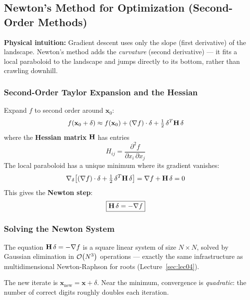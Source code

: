\subsection{Newton's Method for Optimization (Second-Order Methods)}

\noindent\textbf{Physical intuition:} Gradient descent uses only the slope
(first derivative) of the landscape. Newton's method adds the \emph{curvature}
(second derivative) — it fits a local paraboloid to the landscape and jumps
directly to its bottom, rather than crawling downhill.

\subsubsection{Second-Order Taylor Expansion and the Hessian}
Expand $f$ to second order around $\mathbf{x}_0$:
\begin{equation}
f(\mathbf{x}_0 + \delta)
\approx f(\mathbf{x}_0) + (\nabla f)\cdot\delta
+ \tfrac{1}{2}\,\delta^T \mathbf{H}\,\delta
\end{equation}
where the \textbf{Hessian matrix} $\mathbf{H}$ has entries
\begin{equation}
H_{ij} = \frac{\partial^2 f}{\partial x_i\,\partial x_j}
\end{equation}
The local paraboloid has a unique minimum where its gradient vanishes:
\begin{equation}
\nabla_\delta\bigl[(\nabla f)\cdot\delta + \tfrac{1}{2}\,\delta^T\mathbf{H}\,\delta\bigr]
= \nabla f + \mathbf{H}\,\delta = 0
\end{equation}
This gives the \textbf{Newton step}:
\begin{equation}
\boxed{\mathbf{H}\,\delta = -\nabla f}
\end{equation}

\subsubsection{Solving the Newton System}
The equation $\mathbf{H}\,\delta = -\nabla f$ is a square linear system of size
$N\times N$, solved by Gaussian elimination in $\mathcal{O}\!\left(N^3\right)$ operations —
exactly the same infrastructure as multidimensional Newton-Raphson for roots
(Lecture~\ref{sec:lec04}).

The new iterate is $\mathbf{x}_{\text{new}} = \mathbf{x} + \delta$. Near
the minimum, convergence is \emph{quadratic}: the number of correct digits
roughly doubles each iteration.

